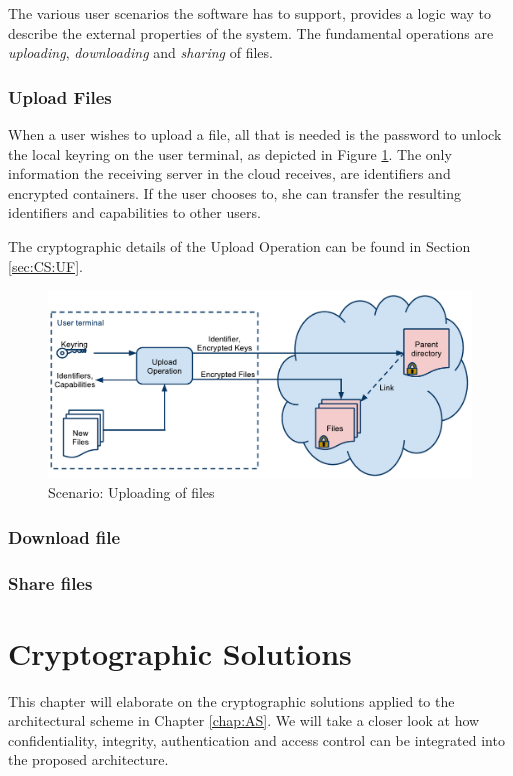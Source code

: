 \documentclass[english,12pt,a4paper]{book}
\begin{document}
The various user scenarios the software has to support, provides a logic way to
describe the external properties of the system. The fundamental operations are
\emph{uploading}, \emph{downloading} and \emph{sharing} of files.

\subsection{Upload Files}

When a user wishes to upload a file, all that is needed is the password to
unlock the local keyring on the user terminal, as depicted in Figure
\ref{fig:arch:upload}. The only information the receiving server in the cloud
receives, are identifiers and encrypted containers. If the user chooses to, she
can transfer the resulting identifiers and capabilities to other users.

The cryptographic details of the Upload Operation can be found in Section
\ref{sec:CS:UF}.

\begin{figure}[h!]
    \centering
    \includegraphics[width=\columnwidth]{ArchitectureUpload.pdf}
    \caption{Scenario: Uploading of files}
    \label{fig:arch:upload}
\end{figure}

\subsection{Download file}

\subsection{Share files}


\chapter{Cryptographic Solutions}
\label{chap:CS}
This chapter will elaborate on the cryptographic solutions applied to the
architectural scheme in Chapter \ref{chap:AS}. We will take a closer look at
how confidentiality, integrity, authentication and access control can be 
integrated into the proposed architecture.
\end{document}
